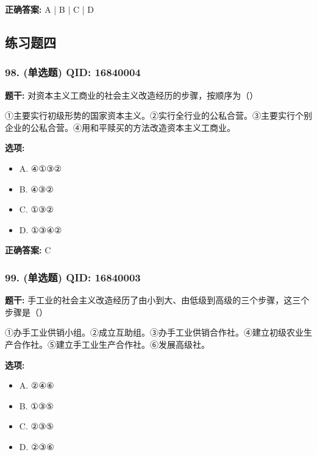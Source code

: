 \documentclass[12pt,UTF8]{ctexart}
\begin{document}
\textbf{正确答案:}
A | B | C | D

\vspace{0.3em}\hrulefill\vspace{0.7em}

\subsection*{练习题四}

\subsubsection*{98. (单选题) \small QID: 16840004}

\textbf{题干:}
对资本主义工商业的社会主义改造经历的步骤，按顺序为（）
\par
①主要实行初级形势的国家资本主义。②实行全行业的公私合营。③主要实行个别企业的公私合营。④用和平赎买的方法改造资本主义工商业。

\textbf{选项:}
\begin{itemize}[leftmargin=*]

  \item A. ④①③②

  \item B. ④③②

  \item C. ①③②

  \item D. ①③④②

\end{itemize}

\textbf{正确答案:}
C

\vspace{0.3em}\hrulefill\vspace{0.7em}

\subsubsection*{99. (单选题) \small QID: 16840003}

\textbf{题干:}
手工业的社会主义改造经历了由小到大、由低级到高级的三个步骤，这三个步骤是（）
\par
①办手工业供销小组。②成立互助组。③办手工业供销合作社。④建立初级农业生产合作社。⑤建立手工业生产合作社。⑥发展高级社。

\textbf{选项:}
\begin{itemize}[leftmargin=*]

  \item A. ②④⑥

  \item B. ①③⑤

  \item C. ②③⑤

  \item D. ②③⑥

\end{itemize}
\end{document}
